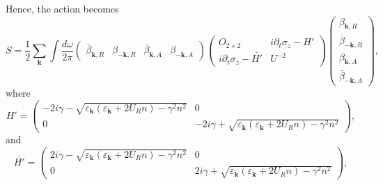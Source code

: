 \documentclass[aps,onecolumn,superscriptaddress,notitlepage,longbibliography]{revtex4-1}
\newcommand{\tmmathbf}[1]{\ensuremath{\boldsymbol{#1}}}
\begin{document}
Hence, the action becomes
\begin{equation}
  S = \frac{1}{2} \sum_{\tmmathbf{k}} \int \frac{d \omega}{2 \pi}
  \left(\begin{array}{cccc}
    \bar{\beta}_{\tmmathbf{k}, R} & \beta_{- \tmmathbf{k}, R} &
    \bar{\beta}_{\tmmathbf{k}, A} & \beta_{- \tmmathbf{k}, A}
  \end{array}\right) \left(\begin{array}{cc}
    O_{2 \times 2} & i\partial_t \sigma_z-H'\\
    i\partial_t \sigma_z-\bar{H'} & U^{-2} 
  \end{array}\right) \left(\begin{array}{c}
    \beta_{\tmmathbf{k}, R}\\
    \bar{\beta}_{- \tmmathbf{k}, R}\\
    \beta_{\tmmathbf{k}, A}\\
    \bar{\beta}_{- \tmmathbf{k}, A}
  \end{array}\right),
\end{equation}
where
\begin{equation}
  H' = \left(\begin{array}{cc}
    - 2 i \gamma - \sqrt{\varepsilon_{\tmmathbf{k}}
    (\varepsilon_{\tmmathbf{k}} + 2 U_R n) - \gamma^2 n^2} & 0\\
    0 & - 2 i \gamma + \sqrt{\varepsilon_{\tmmathbf{k}}
    (\varepsilon_{\tmmathbf{k}} + 2 U_R n) - \gamma^2 n^2}
  \end{array}\right) , \label{Eq:Hprime}
\end{equation}
and 
\begin{equation}
  \bar{H'} = \left(\begin{array}{cc}
    2 i \gamma - \sqrt{\varepsilon_{\tmmathbf{k}}
    (\varepsilon_{\tmmathbf{k}} + 2 U_R n) - \gamma^2 n^2} & 0\\
    0 &  2 i \gamma + \sqrt{\varepsilon_{\tmmathbf{k}}
    (\varepsilon_{\tmmathbf{k}} + 2 U_R n) - \gamma^2 n^2}
  \end{array}\right) ,
\end{equation}
\end{document}
